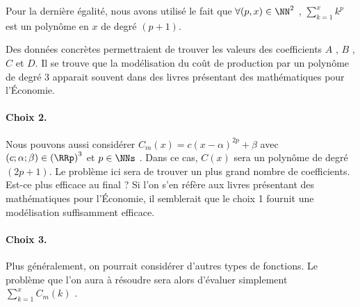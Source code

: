 Pour la dernière égalité, nous avons utilisé le fait que $\forall (p, x) \in \NN^2$ , $\displaystyle \sum_{k = 1}^{x} k^p$ est un polynôme en $x$ de degré $(p + 1)$.


\bigskip

Des données concrètes permettraient de trouver les valeurs des coefficients $A$ , $B$ , $C$ et $D$. Il se trouve que la modélisation du coût de production par un polynôme de degré 3 apparait souvent dans des livres présentant des mathématiques pour l'Économie.




\bigskip

\paragraph{Choix 2.}

Nous pouvons aussi considérer $C_m(x) = c (x - \alpha)^{2p} + \beta$ avec $(c ; \alpha ; \beta) \in \left( \RRp \right)^3$ et $p \in \NNs$ .
Dans ce cas, $C(x)$ sera un polynôme de degré $(2p + 1)$. Le problème ici sera de trouver un plus grand nombre de coefficients. Est-ce plus efficace au final ? Si l'on s'en réfère aux livres présentant des mathématiques pour l'Économie, il semblerait que le choix 1 fournit une modélisation suffisamment efficace.




\bigskip

\paragraph{Choix 3.}

Plus généralement, on pourrait considérer d'autres types de fonctions. Le problème que l'on aura à résoudre sera alors d'évaluer simplement $\displaystyle \sum_{k = 1}^{x} C_m(k)$ .
